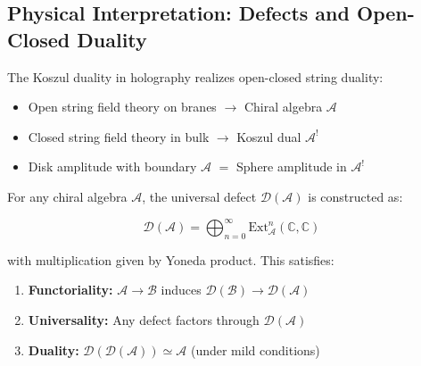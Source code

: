 \subsection{Physical Interpretation: Defects and Open-Closed Duality}

\begin{interpretation}
The Koszul duality in holography realizes open-closed string duality:

\begin{center}
\end{center}

\begin{itemize}
\item Open string field theory on branes $\to$ Chiral algebra $\mathcal{A}$
\item Closed string field theory in bulk $\to$ Koszul dual $\mathcal{A}^!$
\item Disk amplitude with boundary $\mathcal{A}$ $=$ Sphere amplitude in $\mathcal{A}^!$
\end{itemize}
\end{interpretation}

\begin{theorem}\label{thm:universal-defect-construction}
For any chiral algebra $\mathcal{A}$, the universal defect $\mathcal{D}(\mathcal{A})$ is constructed as:

$$\mathcal{D}(\mathcal{A}) = \bigoplus_{n=0}^\infty \text{Ext}^n_{\mathcal{A}}(\mathbb{C}, \mathbb{C})$$

with multiplication given by Yoneda product. This satisfies:
\begin{enumerate}
\item \textbf{Functoriality:} $\mathcal{A} \to \mathcal{B}$ induces $\mathcal{D}(\mathcal{B}) \to \mathcal{D}(\mathcal{A})$
\item \textbf{Universality:} Any defect factors through $\mathcal{D}(\mathcal{A})$
\item \textbf{Duality:} $\mathcal{D}(\mathcal{D}(\mathcal{A})) \simeq \mathcal{A}$ (under mild conditions)
\end{enumerate}
\end{theorem}

